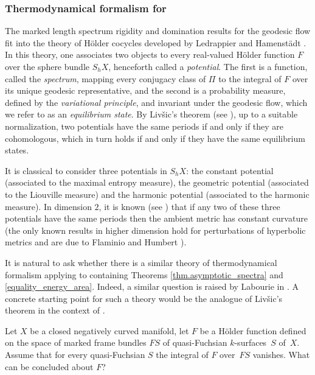 \subsubsection{Thermodynamical formalism for \protect\ksurfaces}

The marked length spectrum rigidity and domination results for the geodesic flow fit into the theory of Hölder cocycles developed by Ledrappier and Hamenstädt \cite{HamenstadtMLS,Ledrappier_bord}. In this theory, one associates two objects to every real-valued Hölder function $F$ over the sphere bundle $S_hX$, henceforth called a \emph{potential}. The first is a function, called the \emph{spectrum}, mapping every conjugacy class of $\Pi$ to the integral of $F$ over its unique geodesic representative, and the second is a probability measure, defined by the \emph{variational principle}, and invariant under the geodesic flow, which we refer to as an \emph{equilibrium state}. By Liv\v{s}ic's theorem (see \cite{Guillemin_Kazhdan,Livsic}), up to a suitable normalization, two potentials have the same periods if and only if they are cohomologous, which in turn holds if and only if they have the same equilibrium states.

It is classical to consider three potentials in $S_hX$: the constant potential (associated to the maximal entropy measure), the geometric potential (associated to the Liouville measure) and the harmonic potential (associated to the harmonic measure). In dimension $2$, it is known (see \cite{Katok_entropy_closed,Katok4,Ledrappier_har_BM}) that if any two of these three potentials have the same periods then the ambient metric has constant curvature (the only known results in higher dimension hold for perturbations of hyperbolic metrics and are due to Flaminio \cite{Flaminio} and Humbert \cite{humbert2024katok}).

It is natural to ask whether there is a similar theory of thermodynamical formalism applying to \ksurfaces containing Theorems \ref{thm.asymptotic_spectra} and \ref{equality_energy_area}. Indeed, a similar question is raised by Labourie in \cite[Quest.\,8]{Labourie_phase_space}. A concrete starting point for such a theory would be the analogue of Liv\v{s}ic's theorem in the context of \ksurfaces.

\begin{question}
Let $X$ be a closed negatively curved manifold, let $F$ be a Hölder function defined on the space of marked frame bundles $FS$ of quasi-Fuchsian $k$\nobreakdash-sur\-faces~$S$ of~$X$. Assume that for every quasi-Fuchsian \ksurface $S$ the integral of $F$ over~$FS$ vanishes. What can be concluded about $F$?
\end{question}

